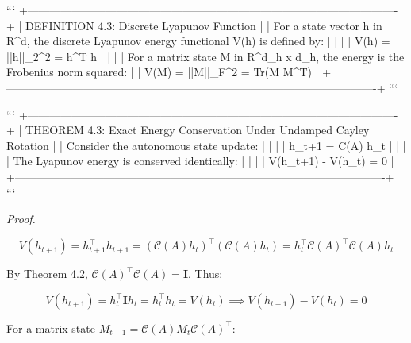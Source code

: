 \documentclass[11pt,twoside,openright]{amsbook}
\begin{document}
{{{{{{```
+----------------------------------------------------------------------------------------------------+
| DEFINITION 4.3: Discrete Lyapunov Function                                                         |
| For a state vector h in R^d, the discrete Lyapunov energy functional V(h) is defined by:           |
|                                                                                                    |
|   V(h) = ||h||_2^2 = h^T h                                                                         |
|                                                                                                    |
| For a matrix state M in R^{d_h x d_h}, the energy is the Frobenius norm squared:                  |
|   V(M) = ||M||_F^2 = Tr(M M^T)                                                                     |
+----------------------------------------------------------------------------------------------------+
```

```
+----------------------------------------------------------------------------------------------------+
| THEOREM 4.3: Exact Energy Conservation Under Undamped Cayley Rotation                              |
| Consider the autonomous state update:                                                              |
|                                                                                                    |
|   h_{t+1} = C(A) h_t                                                                               |
|                                                                                                    |
| The Lyapunov energy is conserved identically:                                                      |
|                                                                                                    |
|   V(h_{t+1}) - V(h_t) = 0                                                                          |
+----------------------------------------------------------------------------------------------------+
```

\textit{Proof.}

$$V(h_{t+1}) = h_{t+1}^\top h_{t+1} = (\mathcal{C}(A) h_t)^\top (\mathcal{C}(A) h_t) = h_t^\top \mathcal{C}(A)^\top \mathcal{C}(A) h_t$$

By Theorem 4.2, $\mathcal{C}(A)^\top \mathcal{C}(A) = \mathbf{I}$. Thus:

$$V(h_{t+1}) = h_t^\top \mathbf{I} h_t = h_t^\top h_t = V(h_t) \implies V(h_{t+1}) - V(h_t) = 0$$

For a matrix state $M_{t+1} = \mathcal{C}(A) M_t \mathcal{C}(A)^\top$:

}}}}}}
\end{document}
